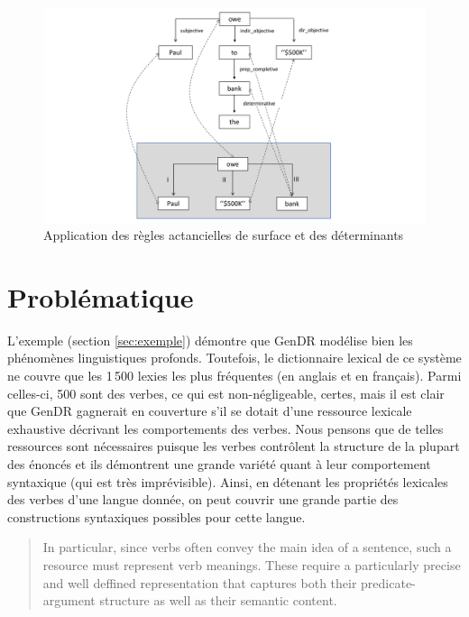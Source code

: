 \begin{figure}[htb]
	\centering
	\includegraphics[width=1\textwidth, trim = {0cm 0.4cm 0cm 0.4cm},clip]{ch3/figs/final_surf_gendr.pdf}
	\caption{Application des règles actancielles de surface et des déterminants}
	\label{fig:syntsurf}
\end{figure}


\section{Problématique}\label{sec:problema}

L'exemple (section \ref{sec:exemple}) démontre que GenDR modélise bien les phénomènes linguistiques profonds. Toutefois, le dictionnaire lexical de ce système ne couvre que les 1\,500 lexies les plus fréquentes (en anglais et en français). Parmi celles-ci, 500 sont des verbes, ce qui est non-négligeable, certes, mais il est clair que GenDR gagnerait en couverture s'il se dotait d'une ressource lexicale exhaustive décrivant les comportements des verbes. Nous pensons que de telles ressources sont nécessaires puisque les verbes contrôlent la structure de la plupart des énoncés et ils démontrent une grande variété quant à leur comportement syntaxique (qui est très imprévisible). Ainsi, en détenant les propriétés lexicales des verbes d'une langue donnée, on peut couvrir une grande partie des constructions syntaxiques possibles pour cette langue.

\begin{quote}
In particular, since verbs often convey the main idea of a sentence, such a resource must represent verb meanings. These require a particularly precise and well deffined representation that captures both their predicate-argument structure as well as their semantic content.
\end{quote}
\vspace{-\baselineskip}
\hfill
\cite{SchulerVerbnetBroadcoverageComprehensive2005}

